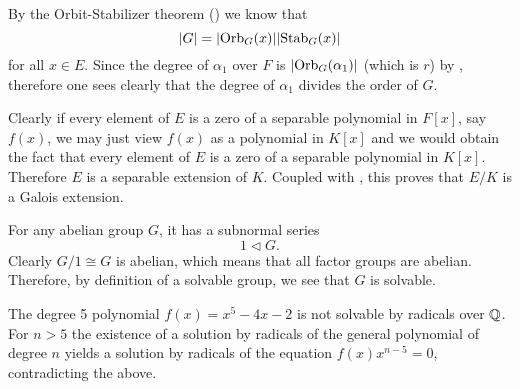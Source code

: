 \begin{questions}
    \item By the Orbit-Stabilizer theorem () we know that
    \[
       |G| = |\mathrm{Orb}_{G}(x)||\mathrm{Stab}_{G}(x)|
    \]
    for all $x \in E$. Since the degree of $\alpha_1$ over $F$ is $|\mathrm{Orb}_{G}(\alpha_1)|$ (which is $r$) by , therefore one sees clearly that the degree of $\alpha_1$ divides the order of $G$.

    \item Clearly if every element of $E$ is a zero of a separable polynomial in $F[x]$, say $f(x)$, we may just view $f(x)$ as a polynomial in $K[x]$ and we would obtain the fact that every element of $E$ is a zero of a separable polynomial in $K[x]$. Therefore $E$ is a separable extension of $K$. Coupled with , this proves that $E/K$ is a Galois extension.

    \item For any abelian group $G$, it has a subnormal series
    \[
        1 \lhd G.
    \]
    Clearly $G/1 \cong G$ is abelian, which means that all factor groups are abelian. Therefore, by definition of a solvable group, we see that $G$ is solvable.

    \item The degree 5 polynomial $f(x) = x^5 - 4x - 2$ is not solvable by radicals over $\mathbb{Q}$. For $n > 5$ the existence of a solution by radicals of the general polynomial of degree $n$ yields a solution by radicals of the equation $f(x)x^{n-5} = 0$, contradicting the above.
\end{questions}

